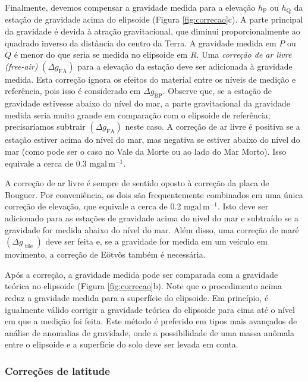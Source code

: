 \documentclass[]{book}
\theoremstyle{definition}
\theoremstyle{definition}
\theoremstyle{definition}
\theoremstyle{remark}
\begin{document}
Finalmente, devemos compensar a gravidade medida para a elevação \(h_{\mathrm{P}}\) ou \(h_{\mathrm{Q}}\) da estação de gravidade acima do elipsoide (Figura \ref{fig:correcao}c). A parte principal da gravidade é devida à atração gravitacional, que diminui proporcionalmente ao quadrado inverso da distância do centro da Terra. A gravidade medida em \(P\) ou \(Q\) é menor do que seria se medida no elipsoide em \(R\). Uma \emph{correção de ar livre (free-air)} \(\left(\Delta g_{\mathrm{FA}}\right)\) para a elevação da estação deve ser adicionada à gravidade medida. Esta correção ignora os efeitos do material entre os níveis de medição e referência, pois isso é considerado em \(\Delta g_{\mathrm{BP}}\). Observe que, se a estação de gravidade estivesse abaixo do nível do mar, a parte gravitacional da gravidade medida seria muito grande em comparação com o elipsoide de referência; precisaríamos subtrair \(\left(\Delta g_{\mathrm{FA}}\right)\) neste caso. A correção de ar livre é positiva se a estação estiver acima do nível do mar, mas negativa se estiver abaixo do nível do mar (como pode ser o caso no Vale da Morte ou ao lado do Mar Morto). Isso equivale a cerca de 0.3 \(\mathrm{mgal}\, \mathrm{m}^{-1}\).

A correção de ar livre é sempre de sentido oposto à correção da placa de Bouguer. Por conveniência, os dois são frequentemente combinados em uma única correção de elevação, que equivale a cerca de 0.2 \(\mathrm{mgal}\, \mathrm{m}^{-1}\). Isto deve ser adicionado para as estações de gravidade acima do nível do mar e subtraído se a gravidade for medida abaixo do nível do mar. Além disso, uma correção de maré \(\left(\Delta g_{\text { tile }}\right)\) deve ser feita e, se a gravidade for medida em um veículo em movimento, a correção de Eötvõs também é necessária.

Após a correção, a gravidade medida pode ser comparada com a gravidade teórica no elipsoide (Figura \ref{fig:correcao}b). Note que o procedimento acima reduz a gravidade medida para a superfície do elipsoide. Em princípio, é igualmente válido corrigir a gravidade teórica do elipsoide para cima até o nível em que a medição foi feita. Este método é preferido em tipos mais avançados de análise de anomalias de gravidade, onde a possibilidade de uma massa anômala entre o elipsoide e a superfície do solo deve ser levada em conta.

\hypertarget{correcoes-de-latitude}{%
\subsubsection{Correções de latitude}\label{correcoes-de-latitude}}
\end{document}
